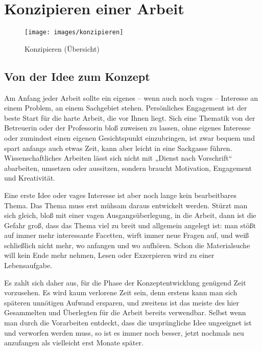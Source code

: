 \documentclass[]{article}
\title{}
\author{}
\date{}
\begin{document}
{
\setcounter{tocdepth}{3}
\tableofcontents
}
\section{Konzipieren einer Arbeit}\label{konzipieren-einer-arbeit}

\begin{figure}

{\centering \texttt{[image: images/konzipieren]} 

}

\caption{Konzipieren (Übersicht)}\label{fig:unnamed-chunk-2}
\end{figure}

\subsection{Von der Idee zum Konzept}\label{von-der-idee-zum-konzept}

Am Anfang jeder Arbeit sollte ein eigenes -- wenn auch noch vages --
Interesse an einem Problem, an einem Sachgebiet stehen. Persönliches
Engagement ist der beste Start für die harte Arbeit, die vor Ihnen
liegt. Sich eine Thematik von der Betreuerin oder der Professorin bloß
zuweisen zu lassen, ohne eigenes Interesse oder zumindest einen eigenen
Gesichtspunkt einzubringen, ist zwar bequem und spart anfangs auch etwas
Zeit, kann aber leicht in eine Sackgasse führen. Wissenschaftliches
Arbeiten lässt sich nicht mit „Dienst nach Vorschrift`` abarbeiten,
umsetzen oder aussitzen, sondern braucht Motivation, Engagement und
Kreativität.

Eine erste Idee oder vages Interesse ist aber noch lange kein
bearbeitbares Thema. Das Thema muss erst mühsam daraus entwickelt
werden. Stürzt man sich gleich, bloß mit einer vagen Ausgangsüberlegung,
in die Arbeit, dann ist die Gefahr groß, dass das Thema viel zu breit
und allgemein angelegt ist: man stößt auf immer mehr interessante
Facetten, wirft immer neue Fragen auf, und weiß schließlich nicht mehr,
wo anfangen und wo aufhören. Schon die Materialsuche will kein Ende mehr
nehmen, Lesen oder Exzerpieren wird zu einer Lebensaufgabe.

Es zahlt sich daher aus, für die Phase der Konzeptentwicklung genügend
Zeit vorzusehen. Es wird kaum verlorene Zeit sein, denn erstens kann man
sich späteren unnötigen Aufwand ersparen, und zweitens ist das meiste
des hier Gesammelten und Überlegten für die Arbeit bereits verwendbar.
Selbst wenn man durch die Vorarbeiten entdeckt, dass die ursprüngliche
Idee ungeeignet ist und verworfen werden muss, so ist es immer noch
besser, jetzt nochmals neu anzufangen als vielleicht erst Monate später.
\end{document}
